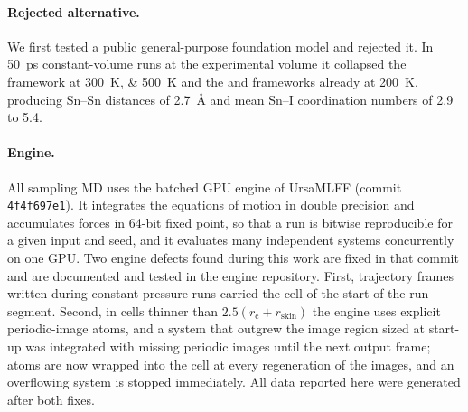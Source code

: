 \paragraph{Rejected alternative.} We first tested a public general-purpose foundation
model\cite{Song2024NEP89} and rejected it. In \SI{50}{ps} constant-volume runs at the experimental
volume it collapsed the \CsSnI{} framework at \SIlist{300;500}{\kelvin} and the \MASnI{} and
\FASnI{} frameworks already at \SI{200}{\kelvin}, producing Sn--Sn distances of
\SI{2.7}{\angstrom} and mean Sn--I coordination numbers of 2.9 to 5.4.

\paragraph{Engine.} All sampling MD uses the batched GPU engine of UrsaMLFF (commit
\texttt{4f4f697e1}). It integrates the equations of motion in double precision and accumulates
forces in 64-bit fixed point, so that a run is bitwise reproducible for a given input and seed, and
it evaluates many independent systems concurrently on one GPU. Two engine defects found during this
work are fixed in that commit and are documented and tested in the engine repository. First,
trajectory frames written during constant-pressure runs carried the cell of the start of the run
segment. Second, in cells thinner than $2.5(r_\mathrm{c}+r_\mathrm{skin})$ the engine uses explicit
periodic-image atoms, and a system that outgrew the image region sized at start-up was integrated
with missing periodic images until the next output frame; atoms are now wrapped into the cell at
every regeneration of the images, and an overflowing system is stopped immediately. All data reported
here were generated after both fixes.


